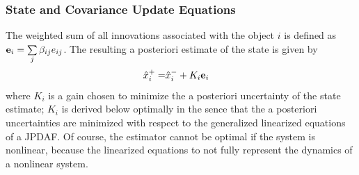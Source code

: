 \documentclass[10pt]{article}
\theoremstyle{plain}\theorembodyfont{\normalfont}
\begin{document}
\subsubsection{State and Covariance Update Equations}
The weighted sum of all innovations associated with the object $i$ is defined as ${\bf{e}}_{i}={\sum\limits_{j} \beta_{ij}e_{ij}}$.
The resulting a posteriori estimate of the state is given by~\cite[Eq. 6-(25-26)]{TrackDataAssoc}
\begin{align}
\hat x^+_{i}=&\hat x^-_{i}+K_{i}{\bf{e}}_{i}\label{eqn:KalEst}
\end{align}
where $K_i$ is a gain chosen to minimize the a posteriori uncertainty of the state estimate; $K_i$ is derived below optimally in the sence that the a posteriori uncertainties are minimized with respect to the generalized linearized equations of a JPDAF. Of course, the estimator cannot be optimal if the system is nonlinear, because the linearized equations to not fully represent the dynamics of a nonlinear system.
\end{document}
